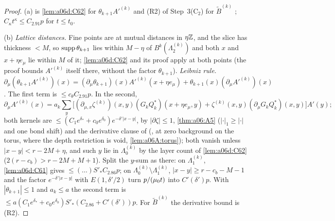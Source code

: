 \begin{proof}
(a) is \cref{lem:a06d:C62} for $\theta_{k+1}A'^{(k)}$ and (R2) of Step~3(C$_2$) for $\tilde B^{(k)}$ \cite[(2.90)]{Ba2}; $C_\kappa t^\kappa\le C_{2.91}p$ for $t\le t_0$.

(b) \emph{Lattice distances.} Fine points are at mutual distances in $\eta\mathbb Z$, and the slice has thickness $<M$, so $\operatorname{supp}\theta_{k+1}$ lies within $M-\eta$ of $B^k(\Lambda^{(k)}_2)$ and both $x$ and $x+\eta e_\mu$ lie within $M$ of it; \cref{lem:a06d:C62} and its proof apply at both points (the proof bounds $A'^{(k)}$ itself there, without the factor $\theta_{k+1}$). \emph{Leibniz rule.} $\partial_\mu(\theta_{k+1}A'^{(k)})(x)=(\partial_\mu\theta_{k+1})(x)A'^{(k)}(x+\eta e_\mu)+\theta_{k+1}(x)(\partial_\mu A'^{(k)})(x)$. The first term is $\le c_\theta C_{2.91}p$. In the second,
\[
\partial_\mu A'^{(k)}(x)=a_k\sum_y\big[(\partial_{\mu,x}\zeta^{(k)})(x,y)(G_kQ_k^*)(x+\eta e_\mu,y)+\zeta^{(k)}(x,y)(\partial_\mu G_kQ_k^*)(x,y)\big]A'(y);
\]
both kernels are $\le(C_1e^{\delta_*}+c_0e^{\delta_0})e^{-\delta'|x-y|}$, by $|\partial\zeta|\le1$, \cref{thm:a06:A5} ($|\cdot|_1\ge|\cdot|$ and one bond shift) and the derivative clause of \cite[Prop.~2.2, (2.58)]{Ba2} (\cite[Thm., (1.9)--(1.10)]{Ba4}, at zero background on the torus, where the depth restriction is void, \cref{lem:a06A:torus}); both vanish unless $|x-y|<r-2M+\eta$, and such $y$ lie in $\Lambda^{(k)}_0$ by the layer count of \cref{lem:a06d:C62} ($2(r-c_b)>r-2M+M+1$). Split the $y$-sum as there: on $\Lambda^{(k)}_1$, \cref{lem:a06d:C61} gives $\le(\dots)S'_*C_{2.86}p$; on $\Lambda^{(k)}_0\setminus\Lambda^{(k)}_1$, $|x-y|\ge r-c_b-M-1$ and the factor $e^{-\delta'|x-y|}$ with $E(1,\delta'/2)$ turn $p/(\mu_0 t)$ into $C'(\delta')p$. With $|\theta_{k+1}|\le1$ and $a_k\le a$ the second term is $\le a(C_1e^{\delta_*}+c_0e^{\delta_0})S'_*(C_{2.86}+C'(\delta'))p$. For $\tilde B^{(k)}$ the derivative bound is (R2).


\end{proof}
